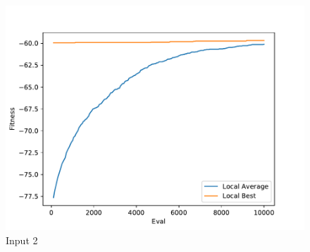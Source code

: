 \documentclass{standalone}
\begin{document}
\begin{figure}[!htb]
	\caption{Input 2}
	\label{fig:graph_2009}
	\includegraphics[width=\textwidth]{../graphs/graphs/2009.pdf}
\end{figure}
\end{document}
